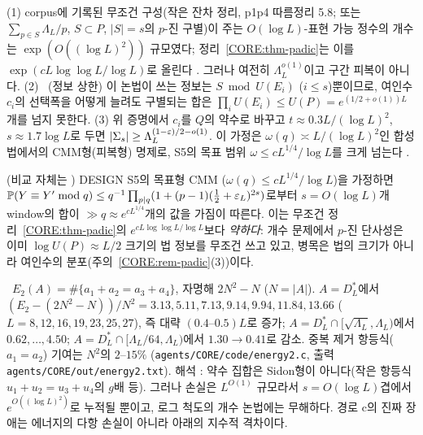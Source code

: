 \begin{remark}[비교와 한계]\label{CORE:rem-padic}
(1) corpus에 기록된 무조건 구성(작은 잔차 정리, p1p4 따름정리 5.8; 또는 $\sum_{p\in S}\Lambda_L/p$, $S\subset P$, $|S|=s$의 $p$-진 구별)이 주는 $O(\log L)$-표현 가능 정수의 개수는 $\exp(O((\log L)^2))$ 규모였다; 정리~\ref{CORE:thm-padic}는 이를 $\exp(cL\log\log L/\log L)$로 올린다 \PROVED. 그러나 여전히 $\Lambda_L^{o(1)}$이고 구간 피복이 아니다.
(2) \PROVED\ (정보 상한) 이 논법이 쓰는 정보는 $S\bmod U(E_i)$ ($i\le s$)뿐이므로, 여인수 $c_i$의 선택폭을 어떻게 늘려도 구별되는 합은 $\prod_iU(E_i)\le U(P)=e^{(1/2+o(1))L}$개를 넘지 못한다.
(3)  위 증명에서 $c_i$를 $Q$의 약수로 바꾸고 $t\approx0.3L/(\log L)^2$, $s\approx1.7\log L$로 두면 $|\Sigma_s|\ge\Lambda_L^{(1-\varepsilon)/2-o(1)}$. 이 가정은 $\omega(q)\asymp L/(\log L)^2$인 합성 법에서의 CMM형(피복형) 명제로, S5의 목표 범위 $\omega\le cL^{1/4}/\log L$를 크게 넘는다 \OPEN.
\end{remark}

\begin{remark}\label{CORE:rem-CMM-count}
 (비교 자체는 \PROVED) DESIGN S5의 목표형 CMM ($\omega(q)\le cL^{1/4}/\log L$)을 가정하면 $\mathbb P(Y\equiv Y'\bmod q)\le q^{-1}\prod_{p\mid q}(1+(p-1)(\frac12+\varepsilon_L)^{2s})$로부터 $s=O(\log L)$개 window의 합이 $\gg q\approx e^{cL^{1/4}}$개의 값을 가짐이 따른다. 이는 무조건 정리~\ref{CORE:thm-padic}의 $e^{cL\log\log L/\log L}$보다 \emph{약하다}: 개수 문제에서 $p$-진 단사성은 이미 $\log U(P)\approx L/2$ 크기의 법 정보를 무조건 쓰고 있고, 병목은 법의 크기가 아니라 여인수의 분포(주의~\ref{CORE:rem-padic}(3))이다.
\end{remark}

\begin{proposition}[2겹 덧셈 에너지]\label{CORE:prop-energy}
\NUMERIC\ $E_2(A)=\#\{a_1+a_2=a_3+a_4\}$, 자명해 $2N^2-N$ ($N=|A|$). $A=D^*_L$에서 $(E_2-(2N^2-N))/N^2=3.13,5.11,7.13,9.14,9.94,11.84,13.66$ ($L=8,12,16,19,23,25,27$), 즉 대략 $(0.4\text{--}0.5)L$로 증가; $A=D^*_L\cap[\sqrt{\Lambda_L},\Lambda_L)$에서 $0.62,\dots,4.50$; $A=D^*_L\cap[\Lambda_L/64,\Lambda_L)$에서 $1.30\to0.41$로 감소. 중복 제거 항등식($a_1=a_2$) 기여는 $N^2$의 $2$–$15\%$ (\texttt{agents/CORE/code/energy2.c}, 출력 \texttt{agents/CORE/out/energy2.txt}).
해석 \HEUR: 약수 집합은 Sidon형이 아니다(작은 항등식 $u_1+u_2=u_3+u_4$의 $g$배 등). 그러나 손실은 $L^{O(1)}$ 규모라서 $s=O(\log L)$겹에서 $e^{O((\log L)^2)}$로 누적될 뿐이고, 로그 척도의 개수 논법에는 무해하다. 경로 c의 진짜 장애는 에너지의 다항 손실이 아니라 아래의 지수적 격차이다.
\end{proposition}


